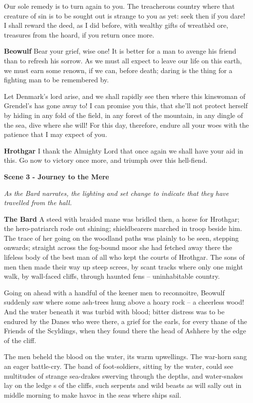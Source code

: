 \documentclass[a4paper]{article}
\begin{document}
{Our sole remedy
is to turn again to you. The treacherous country
where that creature of sin is to be sought out
is strange to you as yet: seek then if you dare!
I shall reward the deed, as I did before,
with wealthy gifts of wreathèd ore,
treasures from the hoard, if you return once more.

\textbf{Beowulf} Bear your grief, wise one! It is better for a man
to avenge his friend than to refresh his sorrow.
As we must all expect to leave
our life on this earth, we must earn some renown,
if we can, before death; daring is the thing
for a fighting man to be remembered by.

Let Denmark’s lord arise, and we shall rapidly see then
where this kinswoman of Grendel’s has gone away to!
I can promise you this, that she’ll not protect herself by hiding
in any fold of the field, in any forest of the mountain,
in any dingle of the sea, dive where she will!
For this day, therefore, endure all your woes
with the patience that I may expect of you.

\textbf{Hrothgar} I thank the Almighty Lord
that once again we shall have your aid in this. 
Go now to victory once more,
and triumph over this hell-fiend.

\centerline{\textbf{Scene 3 - Journey to the Mere}}
\centerline{\textit{As the Bard narrates, the lighting and set change to indicate that they have travelled from the hall.}}

\textbf{The Bard} A steed with braided mane was bridled then,
a horse for Hrothgar; the hero-patriarch
rode out shining; shieldbearers marched
in troop beside him. The trace of her going
on the woodland paths was plainly to be seen,
stepping onwards; straight across
the fog-bound moor she had fetched away there
the lifeless body of the best man
of all who kept the courts of Hrothgar.
The sons of men then made their way
up steep screes, by scant tracks
where only one might walk, by wall-faced cliffs,
through haunted fens – uninhabitable country.

Going on ahead with a handful of the
keener men to reconnoitre,
Beowulf suddenly saw where some ash-trees
hung above a hoary rock
– a cheerless wood! And the water beneath it
was turbid with blood; bitter distress
was to be endured by the Danes who were there,
a grief for the earls, for every thane
of the Friends of the Scyldings, when they found there
the head of Ashhere by the edge of the cliff.

The men beheld the blood on the water,
its warm upwellings. The war-horn sang
an eager battle-cry. The band of foot-soldiers,
sitting by the water, could see multitudes
of strange sea-drakes swerving through the depths,
and water-snakes lay on the ledge s of the cliffs,
such serpents and wild beasts as will sally out
in middle morning to make havoc
in the seas where ships sail.

}
\end{document}

